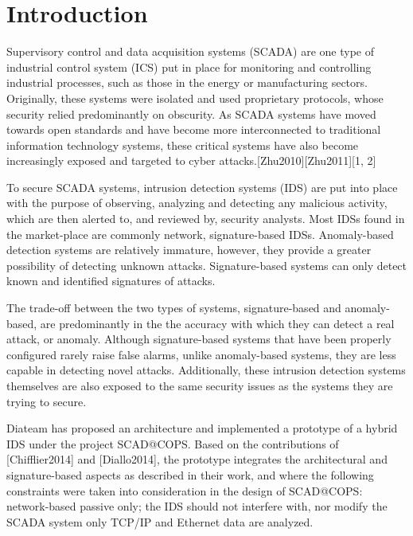 \documentclass[12pt,]{article}
\begin{document}
\newpage
\mbox{} \thispagestyle{empty}

\clearpage
{}

\setcounter{page}{17}

\section{Introduction}\label{introduction}

Supervisory control and data acquisition systems (SCADA) are one type of
industrial control system (ICS) put in place for monitoring and
controlling industrial processes, such as those in the energy or
manufacturing sectors. Originally, these systems were isolated and used
proprietary protocols, whose security relied predominantly on obscurity.
As SCADA systems have moved towards open standards and have become more
interconnected to traditional information technology systems, these
critical systems have also become increasingly exposed and targeted to
cyber attacks.{[}Zhu2010{]}{[}Zhu2011{]}{[}1, 2{]}

To secure SCADA systems, intrusion detection systems (IDS) are put into
place with the purpose of observing, analyzing and detecting any
malicious activity, which are then alerted to, and reviewed by, security
analysts. Most IDSs found in the market-place are commonly network,
signature-based IDSs. Anomaly-based detection systems are relatively
immature, however, they provide a greater possibility of detecting
unknown attacks. Signature-based systems can only detect known and
identified signatures of attacks.

The trade-off between the two types of systems, signature-based and
anomaly-based, are predominantly in the the accuracy with which they can
detect a real attack, or anomaly. Although signature-based systems that
have been properly configured rarely raise false alarms, unlike
anomaly-based systems, they are less capable in detecting novel attacks.
Additionally, these intrusion detection systems themselves are also
exposed to the same security issues as the systems they are trying to
secure.

Diateam has proposed an architecture and implemented a prototype of a
hybrid IDS under the project SCAD@COPS. Based on the contributions of
{[}Chifflier2014{]} and {[}Diallo2014{]}, the prototype integrates the
architectural and signature-based aspects as described in their work,
and where the following constraints were taken into consideration in the
design of SCAD@COPS: network-based passive only; the IDS should not
interfere with, nor modify the SCADA system only TCP/IP and Ethernet
data are analyzed.
\end{document}
